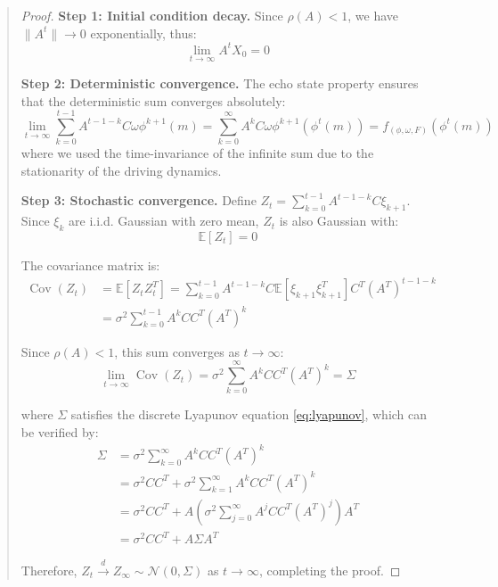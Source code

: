 \documentclass[11pt]{article}
\newcommand{\E}{\mathbb{E}}
\DeclareMathOperator{\Cov}{Cov}
\begin{document}
\begin{quote}
\begin{proof}
\textbf{Step 1: Initial condition decay.} Since $\rho(A) < 1$, we have $\|A^t\| \to 0$ exponentially, thus:
\begin{equation}
\lim_{t \to \infty} A^t X_0 = 0
\end{equation}

\textbf{Step 2: Deterministic convergence.} The echo state property ensures that the deterministic sum converges absolutely:
\begin{equation}
\lim_{t \to \infty} \sum_{k=0}^{t-1} A^{t-1-k}C\omega\phi^{k+1}(m) = \sum_{k=0}^{\infty} A^k C\omega\phi^{k+1}(\phi^t(m)) = f_{(\phi,\omega,F)}(\phi^t(m))
\end{equation}
where we used the time-invariance of the infinite sum due to the stationarity of the driving dynamics.

\textbf{Step 3: Stochastic convergence.} Define $Z_t = \sum_{k=0}^{t-1} A^{t-1-k}C\xi_{k+1}$. Since $\xi_k$ are i.i.d. Gaussian with zero mean, $Z_t$ is also Gaussian with:
\begin{equation}
\E[Z_t] = 0
\end{equation}

The covariance matrix is:
\begin{align}
\Cov(Z_t) &= \E[Z_t Z_t^T] = \sum_{k=0}^{t-1} A^{t-1-k}C \E[\xi_{k+1}\xi_{k+1}^T] C^T (A^T)^{t-1-k}\\
&= \sigma^2 \sum_{k=0}^{t-1} A^k CC^T (A^T)^k
\end{align}

Since $\rho(A) < 1$, this sum converges as $t \to \infty$:
\begin{equation}
\lim_{t \to \infty} \Cov(Z_t) = \sigma^2 \sum_{k=0}^{\infty} A^k CC^T (A^T)^k = \Sigma
\end{equation}

where $\Sigma$ satisfies the discrete Lyapunov equation \eqref{eq:lyapunov}, which can be verified by:
\begin{align}
\Sigma &= \sigma^2 \sum_{k=0}^{\infty} A^k CC^T (A^T)^k\\
&= \sigma^2 CC^T + \sigma^2 \sum_{k=1}^{\infty} A^k CC^T (A^T)^k\\
&= \sigma^2 CC^T + A \left(\sigma^2 \sum_{j=0}^{\infty} A^j CC^T (A^T)^j\right) A^T\\
&= \sigma^2 CC^T + A\Sigma A^T
\end{align}

Therefore, $Z_t \xrightarrow{d} Z_\infty \sim \mathcal{N}(0, \Sigma)$ as $t \to \infty$, completing the proof.
\end{proof}


\end{quote}
\end{document}
